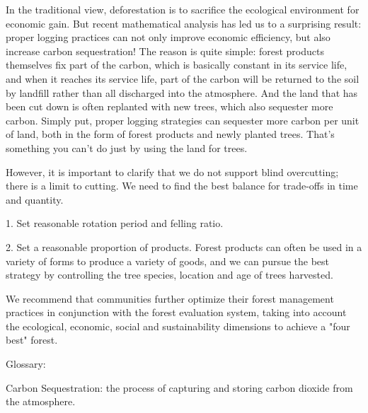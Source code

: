 In the traditional view, deforestation is to sacrifice the ecological environment for economic gain. But recent mathematical analysis has led us to a surprising result: proper logging practices can not only improve economic efficiency, but also increase carbon sequestration!
The reason is quite simple: forest products themselves fix part of the carbon, which is basically constant in its service life, and when it reaches its service life, part of the carbon will be returned to the soil by landfill rather than all discharged into the atmosphere. And the land that has been cut down is often replanted with new trees, which also sequester more carbon. Simply put, proper logging strategies can sequester more carbon per unit of land, both in the form of forest products and newly planted trees. That's something you can't do just by using the land for trees.

However, it is important to clarify that we do not support blind overcutting; there is a limit to cutting. We need to find the best balance for trade-offs in time and quantity.

1. Set reasonable rotation period and felling ratio.

2. Set a reasonable proportion of products. Forest products can often be used in a variety of forms to produce a variety of goods, and we can pursue the best strategy by controlling the tree species, location and age of trees harvested.

We recommend that communities further optimize their forest management practices in conjunction with the forest evaluation system, taking into account the ecological, economic, social and sustainability dimensions to achieve a "four best" forest.

Glossary:

Carbon Sequestration: the process of capturing and storing carbon dioxide from the atmosphere.
